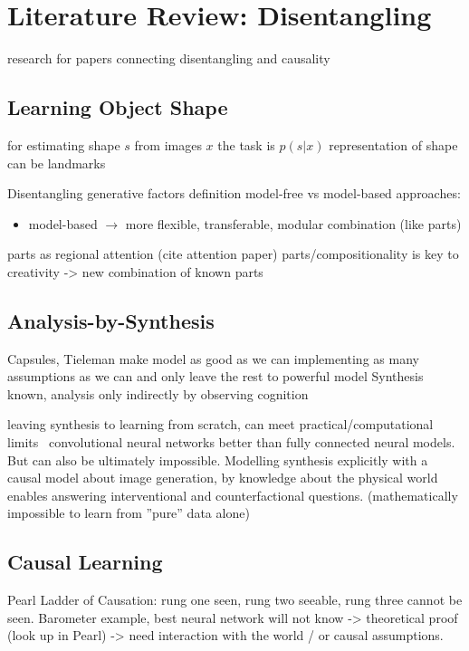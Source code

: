 \chapter{Literature Review: Disentangling}

research for papers connecting disentangling and causality

\section{Learning Object Shape}
for estimating shape $s$ from images $x$ the task is
$p(s|x)$
representation of shape can be landmarks


Disentangling generative factors definition
model-free vs model-based approaches:
\begin{itemize}
	\item model-based $\rightarrow$ more flexible, transferable, modular combination (like parts)
\end{itemize}
parts as regional attention (cite attention paper)
parts/compositionality is key to creativity -> new combination of known parts


\section{Analysis-by-Synthesis}
	Capsules, Tieleman
	make model as good as we can implementing as many assumptions as we can and only leave the rest to powerful model
	Synthesis known, analysis only indirectly by observing cognition

	leaving synthesis to learning from scratch, can meet practical/computational limits \eg\ convolutional neural networks better than fully connected neural models.
	But can also be ultimately impossible. Modelling synthesis explicitly with a causal model about image generation, by knowledge about the physical world enables answering interventional and counterfactional questions. (mathematically impossible to learn from ''pure'' data alone)

\section{Causal Learning}
	Pearl
	Ladder of Causation: rung one seen, rung two seeable, rung three cannot be seen.
	Barometer example, best neural network will not know -> theoretical proof (look up in Pearl) -> need interaction with the world / or causal assumptions.

